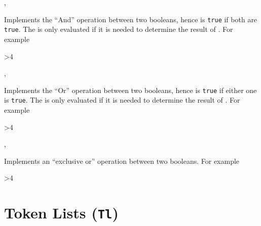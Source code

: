 \documentclass[oneside]{book}
\begin{document}
\begin{function}{\BoolVarAnd,\BoolVarAndTF}
\begin{syntax}
  
    
\end{syntax}
Implements the \enquote{And} operation between two booleans,
hence is \texttt{true} if both are \texttt{true}.
The  is only evaluated if it is needed to determine the result of
.
For example
\begin{demohigh}
 {>{4}} {} {}
\end{demohigh}
\end{function}

\begin{function}{\BoolVarOr,\BoolVarOrTF}
\begin{syntax}
  
    
\end{syntax}
Implements the \enquote{Or} operation between two booleans,
hence is \texttt{true} if either one is \texttt{true}.
The  is only evaluated if it is needed to determine the result of
.
For example
\begin{demohigh}
 {>{4}} {} {}
\end{demohigh}
\end{function}

\begin{function}{\BoolVarXor,\BoolVarXorTF}
\begin{syntax}
  
    
\end{syntax}
Implements an \enquote{exclusive or} operation between two booleans.
For example
\begin{demohigh}
 {>{4}} {} {}
\end{demohigh}
\end{function}

\chapter{Token Lists (\texttt{Tl})}
\end{document}
